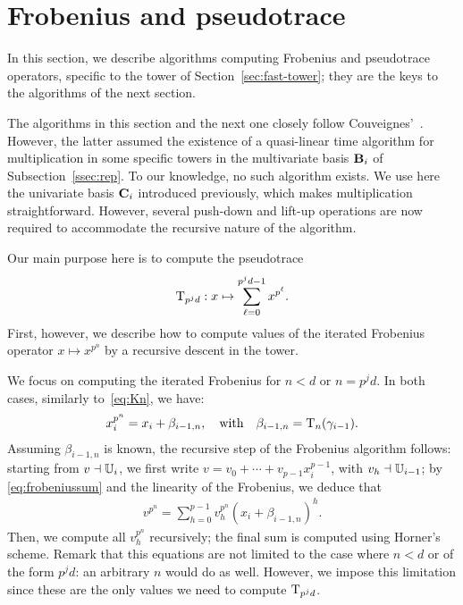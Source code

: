 \section{Frobenius and pseudotrace}
\label{sec:pseudotrace-frobenius}

In this section, we describe algorithms computing Frobenius
and pseudotrace operators, specific to the tower of
Section~\ref{sec:fast-tower}; they are the keys to the algorithms of
the next section.

The algorithms in this section and the next one closely follow
Couveignes'~\cite{couveignes00}. However, the latter assumed the
existence of a quasi-linear time algorithm for multiplication in some
specific towers in the multivariate basis $\mathbf{B}_i$ of
Subsection~\ref{ssec:rep}. To our knowledge, no such algorithm
exists. We use here the univariate basis $\mathbf{C}_i$ introduced
previously, which makes multiplication straightforward. However,
several push-down and lift-up operations are now required to
accommodate the recursive nature of the algorithm.

Our main purpose here is to compute the pseudotrace
\begin{equation}
  \label{eq:74}
  \operatorname{T}_{p^jd}:x\mapsto\sum_{\ell=0}^{p^jd-1}x^{p^{\ell}}
  \text{.}  
\end{equation}
First, however, we describe how to compute values of the iterated
Frobenius operator $x \mapsto x^{p^n}$ by a recursive descent in the
tower.

We focus on computing the iterated Frobenius for $n<d$ or $n=p^jd$. In
both cases, similarly to~\eqref{eq:Kn}, we have:
\begin{gather}
  \label{eq:frobeniussum}
  x_i^{p^{n}} = x_i + \beta_{i-1,n}, \quad\text{with}\quad \beta_{i-1,n}=\operatorname{T}_{n}(\gamma_{i-1}).
\end{gather}
Assuming $\beta_{i-1,n}$ is known, the recursive step of the Frobenius
algorithm follows: starting from $v\dashv\mathbb{U}_i$, we first write
$v=v_0+\cdots+v_{p-1}x_i^{p-1}$, with $v_h\dashv\mathbb{U}_{i-1}$; by
\eqref{eq:frobeniussum} and the linearity of the Frobenius, we deduce
that
\begin{equation}
  \label{eq:frobeniuscomp}
\begin{array}{c}
v^{p^n}
  =\sum_{h=0}^{p-1} v_h^{p^n} \left(x_i + \beta_{i-1,n}\right)^{h}.
\end{array}
\end{equation}
Then, we compute all $v_h^{p^n}$ recursively; the final sum is
computed using Horner's scheme. Remark that this equations are not
limited to the case where $n<d$ or of the form $p^jd$: an arbitrary
$n$ would do as well. However, we impose this limitation since these
are the only values we need to compute $\operatorname{T}_{p^jd}$.

